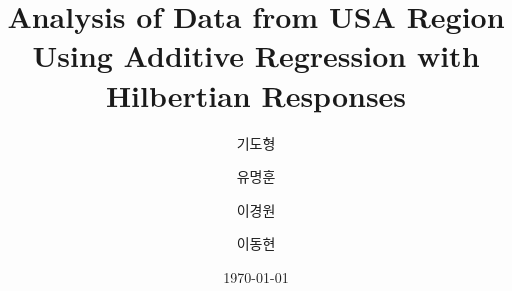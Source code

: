 \documentclass{scrartcl}
\begin{document}
\title{Analysis of Data from USA Region Using Additive Regression with Hilbertian Responses}
\author[1]{기도형}
\author[1]{유명훈}
\author[2]{이경원}
\author[2]{이동현}


\date{\today}
\maketitle









\end{document}
